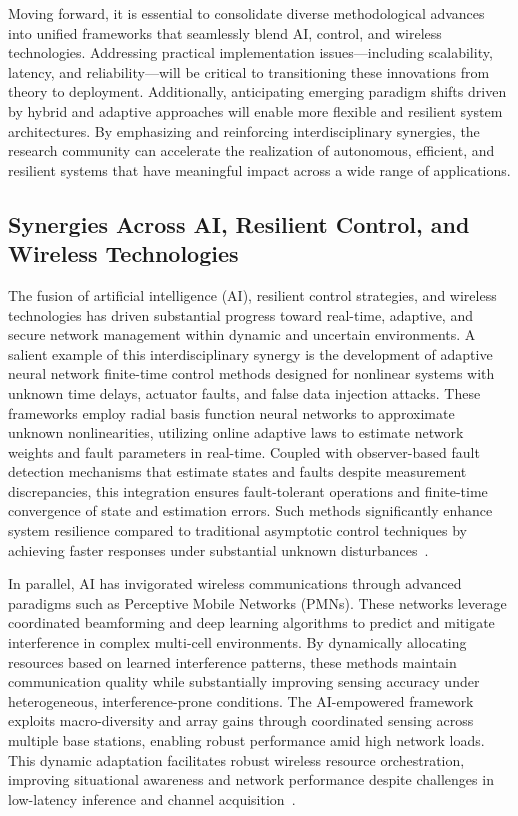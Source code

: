 \documentclass[sigconf]{acmart}
\begin{document}
Moving forward, it is essential to consolidate diverse methodological advances into unified frameworks that seamlessly blend AI, control, and wireless technologies. Addressing practical implementation issues—including scalability, latency, and reliability—will be critical to transitioning these innovations from theory to deployment. Additionally, anticipating emerging paradigm shifts driven by hybrid and adaptive approaches will enable more flexible and resilient system architectures. By emphasizing and reinforcing interdisciplinary synergies, the research community can accelerate the realization of autonomous, efficient, and resilient systems that have meaningful impact across a wide range of applications.

\subsection{Synergies Across AI, Resilient Control, and Wireless Technologies}

The fusion of artificial intelligence (AI), resilient control strategies, and wireless technologies has driven substantial progress toward real-time, adaptive, and secure network management within dynamic and uncertain environments. A salient example of this interdisciplinary synergy is the development of adaptive neural network finite-time control methods designed for nonlinear systems with unknown time delays, actuator faults, and false data injection attacks. These frameworks employ radial basis function neural networks to approximate unknown nonlinearities, utilizing online adaptive laws to estimate network weights and fault parameters in real-time. Coupled with observer-based fault detection mechanisms that estimate states and faults despite measurement discrepancies, this integration ensures fault-tolerant operations and finite-time convergence of state and estimation errors. Such methods significantly enhance system resilience compared to traditional asymptotic control techniques by achieving faster responses under substantial unknown disturbances~\cite{ref46}.

In parallel, AI has invigorated wireless communications through advanced paradigms such as Perceptive Mobile Networks (PMNs). These networks leverage coordinated beamforming and deep learning algorithms to predict and mitigate interference in complex multi-cell environments. By dynamically allocating resources based on learned interference patterns, these methods maintain communication quality while substantially improving sensing accuracy under heterogeneous, interference-prone conditions. The AI-empowered framework exploits macro-diversity and array gains through coordinated sensing across multiple base stations, enabling robust performance amid high network loads. This dynamic adaptation facilitates robust wireless resource orchestration, improving situational awareness and network performance despite challenges in low-latency inference and channel acquisition~\cite{ref47}.
\end{document}

